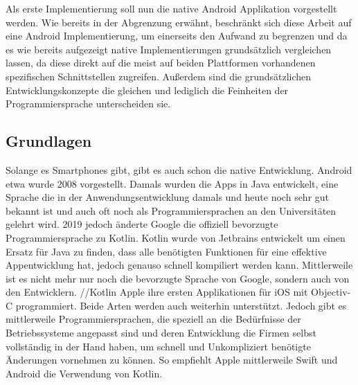 Als erste Implementierung soll nun die native Android Applikation vorgestellt werden. Wie bereits in der Abgrenzung erwähnt, beschränkt sich diese Arbeit auf eine Android Implementierung, um einerseits den Aufwand zu begrenzen und da es wie bereits aufgezeigt native Implementierungen grundsätzlich vergleichen lassen, da diese direkt auf die meist auf beiden Plattformen vorhandenen spezifischen Schnittstellen zugreifen. Außerdem sind die grundsätzlichen Entwicklungskonzepte die gleichen und lediglich die Feinheiten der Programmiersprache unterscheiden sie.

\subsection{Grundlagen}
Solange es Smartphones gibt, gibt es auch schon die native Entwicklung. Android etwa wurde 2008 vorgestellt. Damals wurden die Apps in Java entwickelt, eine Sprache die in der Anwendungsentwicklung damals und heute noch sehr gut bekannt ist und auch oft noch als Programmiersprachen an den Universitäten gelehrt wird. 2019 jedoch änderte Google die offiziell bevorzugte Programmiersprache zu Kotlin. Kotlin wurde von Jetbrains entwickelt um einen Ersatz für Java zu finden, dass alle benötigten Funktionen für eine effektive Appentwicklung hat, jedoch genauso schnell kompiliert werden kann. Mittlerweile ist es nicht mehr nur noch die bevorzugte Sprache von Google, sondern auch von den Entwicklern. //Kotlin Apple ihre ersten Applikationen für iOS mit Objectiv-C programmiert. Beide Arten werden auch weiterhin unterstützt. Jedoch gibt es mittlerweile Programmiersprachen, die speziell an die Bedürfnisse der Betriebssysteme angepasst sind und deren Entwicklung die Firmen selbst vollständig in der Hand haben, um schnell und Unkompliziert benötigte Änderungen vornehmen zu können. So empfiehlt Apple mittlerweile Swift und Android die Verwendung von Kotlin.

